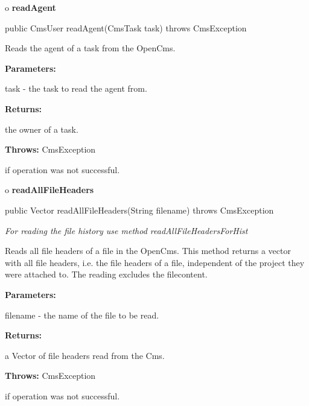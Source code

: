 o {\bf readAgent} 

\begin{PRE}
 public CmsUser readAgent(CmsTask task) throws CmsException
\end{PRE}

\begin{description}
\htmlDD Reads the agent of a task from the OpenCms. 

\begin{description}
\item {\bf Parameters:}  

task - the task to read the agent from.  
\item {\bf Returns:}  

the owner of a task.  
\item {\bf Throws:} CmsException  

if operation was not successful.  
\end{description}

\end{description}

o {\bf readAllFileHeaders} 

\begin{PRE}
 public Vector readAllFileHeaders(String filename) throws CmsException
\end{PRE}

\begin{description}
 {\it For reading the
file history use method readAllFileHeadersForHist} 

Reads all file headers of a file in the OpenCms. \htmlBR
This method returns a vector with all file headers, i.e. the file headers of a
file, independent of the project they were attached to.\htmlBR
The reading excludes the filecontent. 

\begin{description}
\item {\bf Parameters:}  

filename - the name of the file to be read.  
\item {\bf Returns:}  

a Vector of file headers read from the Cms.  
\item {\bf Throws:} CmsException  

if operation was not successful.  
\end{description}

\end{description}

